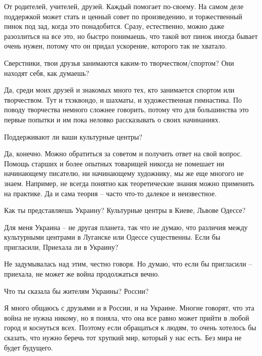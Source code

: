 От родителей, учителей, друзей. Каждый помогает по-своему. На самом деле
поддержкой может стать и ценный совет по произведению, и торжественный пинок
под зад, когда это понадобится. Сразу, естественно, можно даже разозлиться на
все это, но быстро понимаешь, что такой вот пинок иногда бывает очень нужен,
потому что он придал ускорение, которого так не хватало.

Сверстники, твои друзья занимаются каким-то творчеством/спортом? Они находят себя, как думаешь?

Да, среди моих друзей и знакомых много тех, кто занимается спортом или
творчеством. Тут и тхэквондо, и шахматы, и художественная гимнастика. По поводу
творчества немного сложнее говорить, потому что для большинства это первые
попытки и им пока неловко рассказывать о своих начинаниях.

Поддерживают ли ваши культурные центры?

Да, конечно. Можно обратиться за советом и получить ответ на свой вопрос.
Помощь старших и более опытных товарищей никогда не помешает ни начинающему
писателю, ни начинающему художнику, мы же еще многого не знаем. Например, не
всегда понятно как теоретические знания можно применить на практике. Да и сама
теория – часто что-то далекое и неизвестное.

Как ты представляешь Украину? Культурные центры в Киеве, Львове Одессе?

Для меня Украина – не другая планета, так что не думаю, что различия между культурными центрами в Луганске или Одессе существенны.
Если бы пригласили, Приехала ли в Украину?

Не задумывалась над этим, честно говоря. Но думаю, что если бы пригласили – приехала, не может же война продолжаться вечно.

Что ты сказала бы жителям Украины? России?

Я много общаюсь с друзьями и в России, и на Украине. Многие говорят, что эта
война не нужна никому, но я поняла, что она все равно может прийти в любой
город и коснуться всех. Поэтому если обращаться к людям, то очень хотелось бы
сказать, что нужно беречь тот хрупкий мир, который у нас есть. Без мира не
будет будущего.
